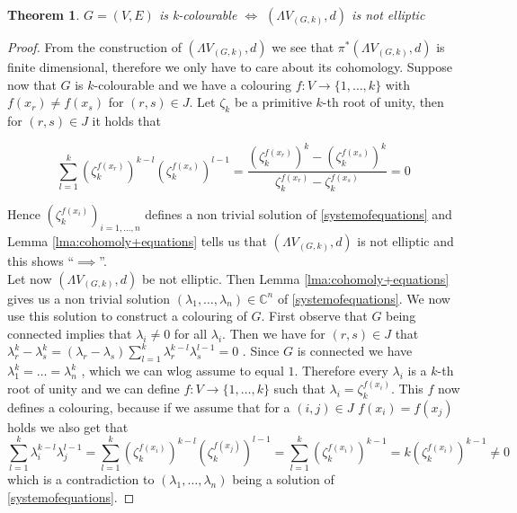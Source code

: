 \documentclass[12pt,a4paper]{scrartcl}
\newtheorem{Theorem}{Theorem}[section]
\numberwithin{equation}{section}
\newcommand{\C}{\mathbb{C}} %
\begin{document}
 \begin{Theorem}
   $G = (V,E)$ is k-colourable $\iff$ $(\Lambda V_{(G,k)},d)$ is not elliptic
 \end{Theorem}

 \begin{proof}
  From the construction of $(\Lambda V_{(G,k)},d)$ we see that  $\pi^*(\Lambda V_{(G,k)},d)$ is finite dimensional, therefore
  we only have to care about its cohomology. Suppose now that $G$ is $k$-colourable and we have a colouring
  $f \colon V \to { \lbrace 1, \dotsc , k \rbrace }$ with $f(x_r) \neq f(x_s)$ for $(r,s) \in J$. Let $\zeta_k$ be a primitive 
  $k$-th root of unity, then for $(r,s) \in J$ it holds that
  
  $$ \sum_{l = 1}^k (\zeta_k^{f(x_r)})^{k-l} (\zeta_k^{f(x_s)})^{l-1}
  = \frac{(\zeta_k^{f(x_r)})^{k} - (\zeta_k^{f(x_s)})^{k}}{ \zeta_k^{f(x_r)} - \zeta_k^{f(x_s)}} = 0
  $$
  
  Hence $(\zeta_k^{f(x_i)})_{i = 1, \dotsc, n}$ defines a non trivial solution of \ref{systemofequations}
  and Lemma \ref{lma:cohomoly+equations} tells us that $(\Lambda V_{(G,k)},d)$ is not elliptic and this shows
  ``$\implies$''. \\
  Let now $(\Lambda V_{(G,k)},d)$ be not elliptic. Then Lemma \ref{lma:cohomoly+equations} gives us a non trivial
  solution $(\lambda_1 , \dotsc, \lambda_n) \in \C^n$ of \ref{systemofequations}. We now use this solution to construct
  a colouring of $G$. First observe that $G$ being connected implies that $\lambda_i \neq 0$ for all $\lambda_i$. Then we have
  for $(r,s) \in J$ that $ \lambda_r^k - \lambda_s^k = ( \lambda_r - \lambda_s) 
  \sum_{l = 1}^k \lambda_r^{k - l} \lambda_s^{l - 1} = 0$ . Since $G$ is connected we have 
  $\lambda_1^k = \dotsc = \lambda_n^k$ , which we can wlog assume to equal $1$. Therefore every $\lambda_i$ is a 
  $k$-th root of unity and we can define $f \colon V \to { \lbrace 1, \dotsc , k \rbrace }$ such that 
  $\lambda_i = \zeta_k^{f(x_i)}$. This $f$ now defines a colouring, because if we assume that for a $(i,j) \in J$
  $f(x_i) = f(x_j)$ holds we also get that 
  $$\sum_{l = 1}^k \lambda_i^{k - l} \lambda_j^{l - 1} = \sum_{l = 1}^k (\zeta_k^{f(x_i)})^{k-l} (\zeta_k^{f(x_j)})^{l-1}
  = \sum_{l = 1}^k (\zeta_k^{f(x_i)})^{k-1} = k (\zeta_k^{f(x_i)})^{k-1} \neq 0$$ 
  which is a contradiction to $(\lambda_1 , \dotsc, \lambda_n)$ being a solution of \ref{systemofequations}.
  
 \end{proof}
\end{document}
